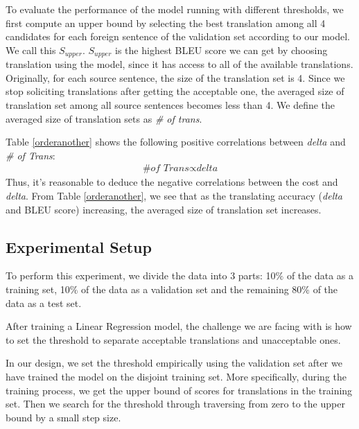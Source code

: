 \documentclass[11pt]{article}
\begin{document}
 To evaluate the performance of the model running with different thresholds, we first compute an upper bound by selecting the best translation among all 4 candidates for each foreign sentence of the validation set according to our  model. We call this  $S_{upper}$.  $S_{upper}$ is the highest BLEU score we can get by choosing translation using the model, since it has access to all of the available translations. Originally, for each source sentence, the size of the translation set is 4. Since we stop soliciting translations after getting the acceptable one, the averaged size of translation set among all source sentences becomes less than 4. We define the averaged size of translation sets as \textit{\# of trans}.

Table \ref{orderanother} shows the following positive correlations between  \textit{delta} and \textit{\# of Trans}: 
\begin{align*}
\textit{\# of Trans} \propto \textit{delta} 
\end{align*}
Thus, it's reasonable to deduce the negative correlations between the cost and \textit{delta}.  From Table \ref{orderanother}, we see that as the  translating accuracy (\textit{delta} and BLEU score) increasing, the averaged size of translation set increases.  
 \subsection{Experimental Setup}
 
 To perform this experiment, we divide the data into 3 parts: 10$\%$ of the data as a training set, 10$\%$ of the data as a validation set and the remaining 80$\%$ of the data as a test set. 

After  training  a Linear Regression model, the challenge we are facing with is how to set the threshold to separate acceptable translations and unacceptable ones. 
 
 
 In our design, we set the threshold empirically using the validation set after we have trained the model on the disjoint training set. More specifically, during the training process, we get the upper bound of scores for translations in the training set. Then we search for the threshold through traversing from  zero to the upper bound by a small step size. %
 
\end{document}
